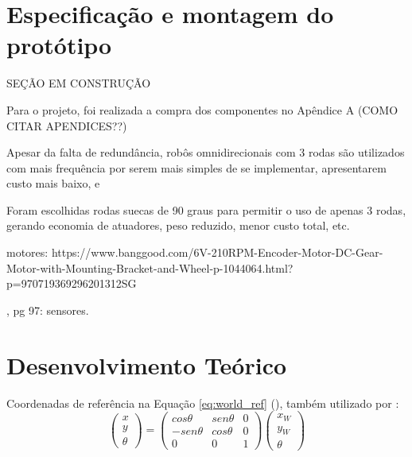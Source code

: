 

\section{Especificação e montagem do protótipo}
\label{sec:montagem}

SEÇÃO EM CONSTRUÇÃO

Para o projeto, foi realizada a compra dos componentes no Apêndice A (COMO CITAR APENDICES??)

Apesar da falta de redundância, robôs omnidirecionais com 3 rodas são utilizados com mais frequência por serem mais simples de se implementar, apresentarem custo mais baixo, e

Foram escolhidas rodas suecas de 90 graus para permitir o uso de apenas 3 rodas, gerando economia de atuadores, peso reduzido, menor custo total, etc.

motores:
https://www.banggood.com/6V-210RPM-Encoder-Motor-DC-Gear-Motor-with-Mounting-Bracket-and-Wheel-p-1044064.html?p=970719369296201312SG

\cite{siegwart2011introduction}, pg 97: sensores.

\section{Desenvolvimento Teórico}
\label{sec:teorico}


Coordenadas de referência na Equação \ref{eq:world_ref} (\cite{siegwart2011introduction}), também utilizado por \cite{ritter2016modelagem}:
\begin{equation}
  \begin{pmatrix}
    x \\
    y \\
    \theta
  \end{pmatrix}
  =
  \begin{pmatrix}
    cos \theta & sen \theta & 0 \\
    -sen\theta & cos \theta & 0 \\
    0          & 0          & 1
  \end{pmatrix}
  \begin{pmatrix}
    x_W \\
    y_W \\
    \theta
  \end{pmatrix}
  \label{eq:world_ref}
\end{equation}

